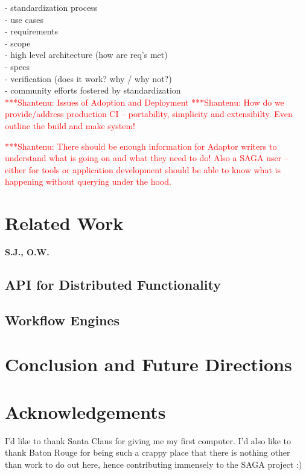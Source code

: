 \documentclass[a4paper,10pt]{article}
\newcommand{\jhanote}[1]{  {\textcolor{red}     { ***Shantenu: #1 }}}
\newcommand{\jhanote}[1]{}
\begin{document}
    - standardization process\\
      - use cases\\
      - requirements\\
      - scope\\
      - high level architecture (how are req's met)\\
      - specs\\
      - verification (does it work?  why / why not?)\\
    - community efforts fostered by standardization\\


 \jhanote{Issues of Adoption and Deployment} \jhanote{How do we
   provide/address production CI -- portability, simplicity and
   extensibilty. Even outline the build and make system!}

 \jhanote{There should be enough information for Adaptor writers to
   understand what is going on and what they need to do! Also a SAGA
   user -- either for tools or application development should be able
   to know what is happening without querying under the hood.}
   


\section{Related Work}
 \textbf{S.J., O.W.}

\subsection{API for Distributed Functionality}

\subsection{Workflow Engines}

\section{Conclusion and Future Directions}

\section{Acknowledgements}
 
I'd like to thank Santa Claus for giving me my first computer. I'd
also like to thank Baton Rouge for being such a crappy place that
there is nothing other than work to do out here, hence contributing
immensely to the SAGA project :)


 

\end{document}

